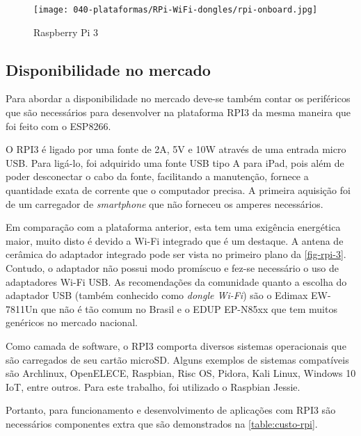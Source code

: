 \begin{figure}[htb]
	\caption{\label{fig-rpi-3}Raspberry Pi 3 }
	\begin{center}
		\texttt{[image: 040-plataformas/RPi-WiFi-dongles/rpi-onboard.jpg]}
	\end{center}
\end{figure}



\subsection{Disponibilidade no mercado}
\label{subsec:mercado-rpi}

Para abordar a disponibilidade no mercado deve-se também contar os periféricos
que são necessários para desenvolver na plataforma RPI3 da mesma maneira que
foi feito com o ESP8266.

O RPI3 é ligado por uma fonte de 2A, 5V e 10W através de uma entrada micro
USB. Para ligá-lo, foi adquirido uma fonte USB tipo A para iPad, pois além de
poder desconectar o cabo da fonte, facilitando a manutenção, fornece a
quantidade exata de corrente que o computador precisa. A primeira aquisição foi
de um carregador de \emph{smartphone} que não forneceu os amperes necessários.

Em comparação com a plataforma anterior, esta tem uma exigência energética maior,
muito disto é devido a Wi-Fi integrado que é um destaque.
A antena de cerâmica do adaptador integrado pode ser vista no primeiro plano da
\autoref{fig-rpi-3}. Contudo, o adaptador não possui modo promíscuo e fez-se
necessário o uso de adaptadores Wi-Fi USB. As recomendações da comunidade
quanto a escolha do adaptador USB (também conhecido como \emph{dongle Wi-Fi})
são o Edimax EW-7811Un que não é tão comum no Brasil e o
EDUP EP-N85xx que tem muitos genéricos no mercado nacional.

Como camada de software, o RPI3 comporta diversos sistemas operacionais que são
carregados de seu cartão microSD. Alguns exemplos de sistemas compatíveis são
Archlinux, OpenELECE, Raspbian, Risc OS, Pidora, Kali Linux, Windows 10 IoT,
entre outros. Para este trabalho, foi utilizado o Raspbian Jessie.

Portanto, para funcionamento e desenvolvimento de aplicações com RPI3 são
necessários componentes extra que são  demonstrados na
\autoref{table:custo-rpi}.

